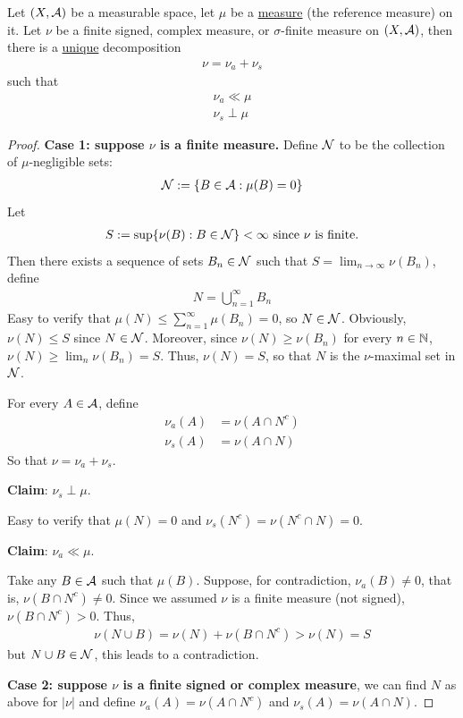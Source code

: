\documentclass[11pt]{article}
\begin{document}
	\begin{theorem}
		Let $(X, \mathcal{{A}})$ be a measurable space, let $\mu$ be a \ul{measure} (the reference measure) on it. Let $\nu$ be a finite signed, complex measure, or $\sigma$-finite measure on $(X, \mathcal{{A}})$, then there is a \ul{unique} decomposition
		\begin{align}
			\nu = \nu_a + \nu_s
		\end{align}
		such that
		\begin{align}
			\nu_a \ll \mu \\
			\nu_s \perp \mu
		\end{align}
		\begin{proof}
			\textbf{Case 1: suppose $\nu$ is a finite measure.}
			Define $\mathcal{{N}}$ to be the collection of $\mu$-negligible sets:
			\begin{align}
				\mathcal{{N}} := \{B \in \mathcal{{A}} : \mu(B) = 0\}
			\end{align}
			Let
			\begin{align}
				S := \sup\{\nu(B) : B \in \mathcal{{N}}\} < \infty \text{{ since $\nu$ is finite.}}
			\end{align}
			Then there exists a sequence of sets $B_n \in \mathcal{{N}}$ such that $S = \lim_{n\to\infty} \nu(B_n)$, define
			\begin{align}
				N = \bigcup_{n=1}^\infty B_n
			\end{align}
			Easy to verify that $\mu(N) \leq \sum_{n=1}^\infty \mu(B_n) = 0$, so $N \in \mathcal{{N}}$.
			Obviously, $\nu(N) \leq S$ since $N \in \mathcal{{N}}$. Moreover, since $\nu(N) \geq \nu(B_n)$ for every $n \in \mathbb{N}$, $\nu(N) \geq \lim_n \nu(B_n) = S$. 
			Thus, $\nu(N) = S$, so that $N$ is the $\nu$-maximal set in $\mathcal{{N}}$.
			
			For every $A \in \mathcal{{A}}$, define
			\begin{align}
				\nu_a(A) &= \nu(A \cap N^c) \\
				\nu_s(A) &= \nu(A \cap N)
			\end{align}
			So that $\nu = \nu_a + \nu_s$.
			\begin{tcolorbox}
				\textbf{Claim}: $\nu_s \perp \mu$.
				
				Easy to verify that $\mu(N) = 0$ and $\nu_s(N^c) = \nu(N^c \cap N) = 0$.
			\end{tcolorbox}
			\begin{tcolorbox}
				\textbf{Claim}: $\nu_a \ll \mu$.
				
				Take any $B \in \mathcal{{A}}$ such that $\mu(B)$.
				Suppose, for contradiction, $\nu_a(B) \neq 0$, that is, $\nu(B \cap N^c) \neq 0$.
				Since we assumed $\nu$ is a finite measure (not signed), $\nu(B \cap N^c) > 0$.
				Thus,
				\begin{align}
					\nu(N \cup B) = \nu(N) + \nu(B \cap N^c) > \nu(N) = S
				\end{align}
				but $N \cup B \in \mathcal{{N}}$, this leads to a contradiction. 
			\end{tcolorbox}
			\textbf{Case 2: suppose $\nu$ is a finite signed or complex measure}, we can find $N$ as above for $|\nu|$ and define $\nu_a(A) = \nu(A \cap N^c)$ and $\nu_s(A) = \nu(A \cap N)$.
			

\end{proof}
\end{theorem}
\end{document}
